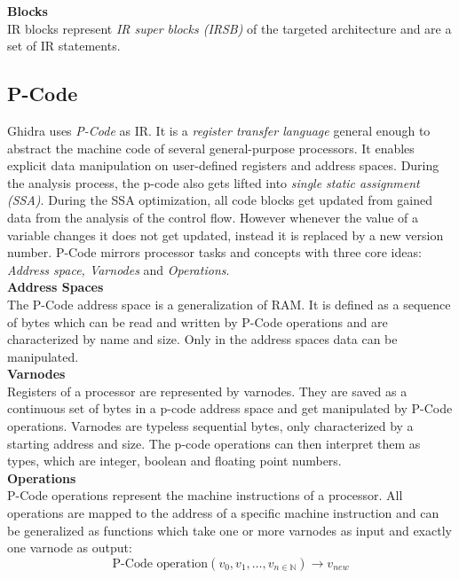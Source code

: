\documentclass[seminar]{plai}
\begin{document}
\noindent\textbf{Blocks}\\
IR blocks represent \textit{IR super blocks (IRSB)} of the targeted architecture and are a set of IR statements.

\subsection{P-Code}
 Ghidra uses \textit{P-Code} as IR. It is a \textit{register transfer language} \cite{PCode-reference-manual} general enough to abstract the machine code of several general-purpose processors. It enables explicit data manipulation on user-defined registers and address spaces. During the analysis process, the p-code also gets lifted into \textit{single static assignment (SSA)}\cite{working-with-ghidras-pCode-to-identify-vulnerable-function-calls}. During the SSA optimization, all code blocks get updated from gained data from the analysis of the control flow. However whenever the value of a variable changes it does not get updated, instead it is replaced by a new version number.\cite{introduction-to-compilers-and-language-design}
P-Code mirrors processor tasks and concepts with three core ideas: \textit{Address space, Varnodes} and \textit{Operations}.\\

\noindent\textbf{Address Spaces}\\
The P-Code address space is a generalization of RAM.
It is defined as a sequence of bytes which can be read and written by P-Code operations and are characterized by name and size. Only in the address spaces data can be manipulated.\\

\noindent\textbf{Varnodes}\\
Registers of a processor are represented by varnodes. They are saved as a continuous set of bytes in a p-code address space and get manipulated by P-Code operations.
Varnodes are typeless sequential bytes, only characterized by a starting address and size. The p-code operations can then interpret them as types, which are integer, boolean and floating point numbers.\\

\noindent\textbf{Operations}\\
P-Code operations represent the machine instructions of a processor.
All operations are mapped to the address of a specific machine instruction and can be generalized as functions which take one or more varnodes as input and exactly one varnode as output:\cite{PCode-reference-manual}
$$
\text{P-Code operation}(v_0,v_1,\dots,v_{n\in\mathbb N}) \rightarrow v_{new}
$$
\end{document}
